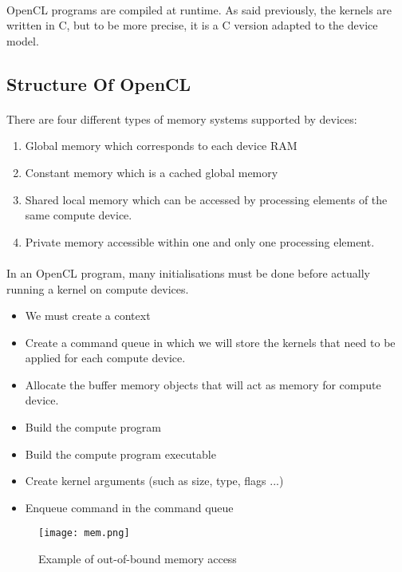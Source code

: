 \documentclass{article}
\begin{document}
\begin{itemize}
\paragraph{}
OpenCL programs are compiled at runtime. As said previously, the kernels are written in C, but to be more precise, it is a C version adapted to the device model.

\subsection{Structure Of OpenCL}

\paragraph{}
There are four different types of memory systems supported by devices:\begin{enumerate}
\item Global memory which corresponds to each device RAM
\item Constant memory which is a cached global memory
\item Shared local memory which can be accessed by processing elements of the same compute device.
\item Private memory accessible within one and only one processing element.
\end{enumerate}

\paragraph{}
In an OpenCL program, many initialisations must be done before actually running a kernel on compute devices. 
\begin{itemize}
\item We must create a context
\item Create a command queue in which we will store the kernels that need to be applied for each compute device.
\item Allocate the buffer memory objects that will act as memory for compute device.
\item Build the compute program
\item Build the compute program executable
\item Create kernel arguments (such as size, type, flags ...)
\item Enqueue command in the command queue
\end{itemize}

\begin{figure}[h]
	\centering
	\texttt{[image: mem.png]}
	\caption{Example of out-of-bound memory access}
	\label{fig:mem}
\end{figure}


\end{itemize}
\end{document}
